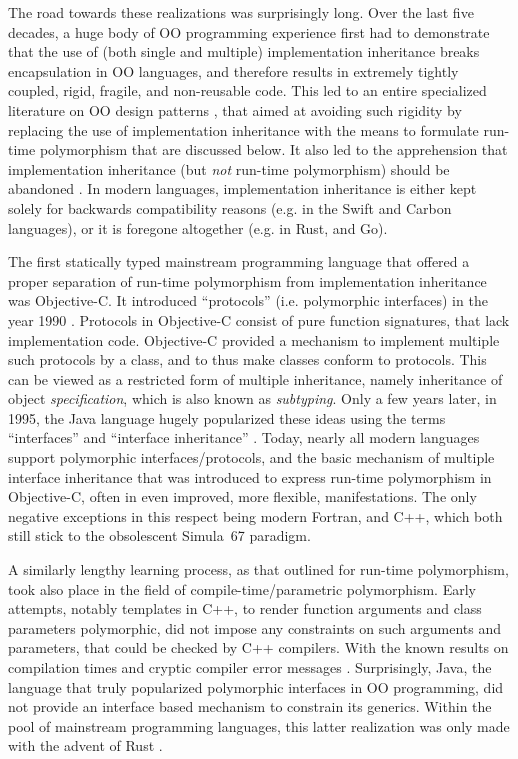 \documentclass[11pt,oneside]{report}
\begin{document}
The road towards these realizations was surprisingly long. Over
the last five decades, a huge body of OO programming experience first
had to demonstrate that the use of (both single and multiple)
implementation inheritance breaks encapsulation in OO languages, and
therefore results in extremely tightly coupled, rigid, fragile, and
non-reusable code. This led to an entire specialized literature on OO
design patterns \cite{Gamma_et_al_94,Martin_03,Holub_04}, that aimed
at avoiding such rigidity by replacing the use of implementation
inheritance with the means to formulate run-time polymorphism that are
discussed below. It also led to the apprehension that implementation
inheritance (but \emph{not} run-time polymorphism) should be abandoned
\cite{Weck_Szyperski}. In modern languages, implementation inheritance
is either kept solely for backwards compatibility reasons (e.g. in the
Swift and Carbon languages), or it is foregone altogether (e.g. in
Rust, and Go).

The first statically typed mainstream programming language that
offered a proper separation of run-time polymorphism from
implementation inheritance was Objective-C. It introduced
``protocols'' (i.e. polymorphic interfaces) in the year 1990
\cite{Cox_et_al_20}. Protocols in Objective-C consist of pure function
signatures, that lack implementation code. Objective-C provided a
mechanism to implement multiple such protocols by a class, and to thus
make classes conform to protocols. This can be viewed as a restricted
form of multiple inheritance, namely inheritance of object
\emph{specification}, which is also known as \emph{subtyping}. Only a
few years later, in 1995, the Java language hugely popularized these
ideas using the terms ``interfaces'' and ``interface inheritance''
\cite{Cox_et_al_20}. Today, nearly all modern languages support
polymorphic interfaces/protocols, and the basic mechanism of multiple
interface inheritance that was introduced to express run-time
polymorphism in Objective-C, often in even improved, more flexible,
manifestations. The only negative exceptions in this respect being
modern Fortran, and C++, which both still stick to the obsolescent
Simula~67 paradigm.

A similarly lengthy learning process, as that outlined for run-time
polymorphism, took also place in the field of compile-time/parametric
polymorphism. Early attempts, notably templates in C++, to render
function arguments and class parameters polymorphic, did not impose
any constraints on such arguments and parameters, that could be
checked by C++ compilers. With the known results on compilation times
and cryptic compiler error messages
\cite{Haveraaen_et_al_19}. Surprisingly, Java, the language that truly
popularized polymorphic interfaces in OO programming, did not provide
an interface based mechanism to constrain its generics. Within the
pool of mainstream programming languages, this latter realization was
only made with the advent of Rust \cite{Matsakis_2014}.
\end{document}
